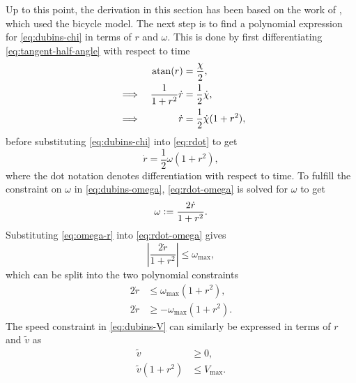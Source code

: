 Up to this point, the derivation in this section has been based on the work of \citet{mercy2017spline}, which used the bicycle model. The next step is to find a polynomial expression for \cref{eq:dubins-chi} in terms of $r$ and $\omega$. This is done by first differentiating \cref{eq:tangent-half-angle} with respect to time
\begin{equation}\label{eq:rdot}
    \begin{aligned}
        &&\operatorname{atan}(r) &= \frac{\chi}{2}, \\
        &\implies& \frac{1}{1 + r^2} \dot r &= \frac{1}{2} \dot \chi, \\
        &\implies& \dot r &= \frac{1}{2} \dot \chi (1 + r^2),
    \end{aligned}
\end{equation}
before substituting \cref{eq:dubins-chi} into \cref{eq:rdot} to get
\begin{equation}\label{eq:rdot-omega}
    \dot r = \frac{1}{2} \omega (1 + r^2),
\end{equation}
where the dot notation denotes differentiation with respect to time.
To fulfill the constraint on $\omega$ in \cref{eq:dubins-omega}, \cref{eq:rdot-omega} is solved for $\omega$ to get
\begin{equation}\label{eq:omega-r}
    \omega \vcentcolon= \frac{2 \dot r}{1 + r^2}.
\end{equation}
Substituting \cref{eq:omega-r} into \cref{eq:rdot-omega} gives
\begin{equation}\label{eq:rdot-omega-r}
    \left|\frac{2 \dot r}{1 + r^2}\right| \leq \omega_{\max},
\end{equation}
which can be split into the two polynomial constraints
\begin{subequations}\label{eq:rdot-omega-r-constraints}
    \begin{align}
        2 \dot r &\leq \omega_{\max} (1 + r^2), \label{eq:rdot-omega-r-constraint1} \\
        2 \dot r &\geq -\omega_{\max} (1 + r^2). \label{eq:rdot-omega-r-constraint2}
    \end{align}
\end{subequations}
The speed constraint in \cref{eq:dubins-V} can similarly be expressed in terms of $r$ and $\tilde v$ as
\begin{subequations}\label{eq:V-r}
    \begin{align}
        \tilde v &\ge 0, \\
        \tilde v (1 + r^2) &\leq V_{\max}.
    \end{align}
\end{subequations}

